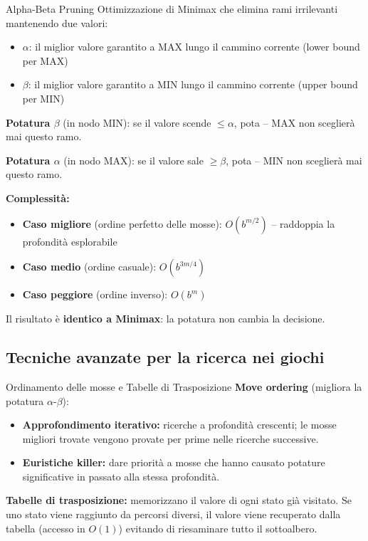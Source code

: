 \documentclass[12pt,a4paper]{article}
\begin{document}
\begin{thmbox}{Alpha-Beta Pruning}
Ottimizzazione di Minimax che elimina rami irrilevanti mantenendo due valori:
\begin{itemize}[noitemsep]
  \item $\alpha$: il miglior valore garantito a MAX lungo il cammino corrente (lower bound per MAX)
  \item $\beta$: il miglior valore garantito a MIN lungo il cammino corrente (upper bound per MIN)
\end{itemize}

\textbf{Potatura $\beta$} (in nodo MIN): se il valore scende $\leq \alpha$, pota -- MAX non sceglierà mai questo ramo.

\textbf{Potatura $\alpha$} (in nodo MAX): se il valore sale $\geq \beta$, pota -- MIN non sceglierà mai questo ramo.

\textbf{Complessità:}
\begin{itemize}[noitemsep]
  \item \textbf{Caso migliore} (ordine perfetto delle mosse): $O(b^{m/2})$ -- raddoppia la profondità esplorabile
  \item \textbf{Caso medio} (ordine casuale): $O(b^{3m/4})$
  \item \textbf{Caso peggiore} (ordine inverso): $O(b^m)$
\end{itemize}
Il risultato è \textbf{identico a Minimax}: la potatura non cambia la decisione.
\end{thmbox}

\subsection{Tecniche avanzate per la ricerca nei giochi}

\begin{defbox}{Ordinamento delle mosse e Tabelle di Trasposizione}
\textbf{Move ordering} (migliora la potatura $\alpha$-$\beta$):
\begin{itemize}[noitemsep]
  \item \textbf{Approfondimento iterativo:} ricerche a profondità crescenti; le mosse migliori trovate vengono provate per prime nelle ricerche successive.
  \item \textbf{Euristiche killer:} dare priorità a mosse che hanno causato potature significative in passato alla stessa profondità.
\end{itemize}

\textbf{Tabelle di trasposizione:} memorizzano il valore di ogni stato già visitato. Se uno stato viene raggiunto da percorsi diversi, il valore viene recuperato dalla tabella (accesso in $O(1)$) evitando di riesaminare tutto il sottoalbero.
\end{defbox}
\end{document}

